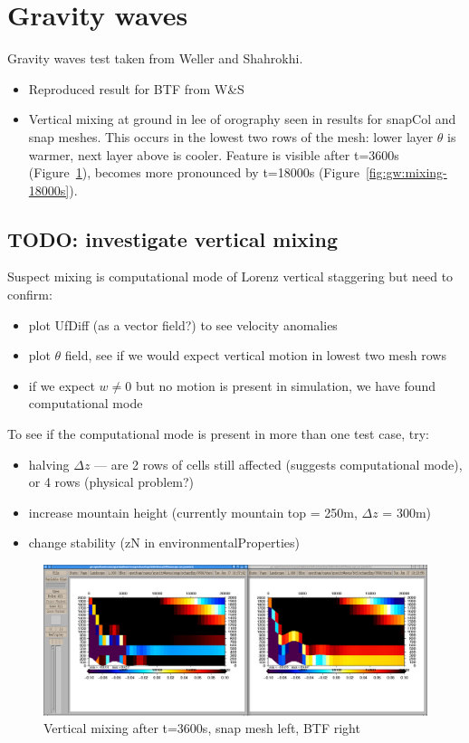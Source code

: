 \section{Gravity waves}

Gravity waves test taken from Weller and Shahrokhi.

\begin{itemize}
\item Reproduced result for BTF from W\&S
\item Vertical mixing at ground in lee of orography seen in results for snapCol and snap meshes.  This occurs in the lowest two rows of the mesh: lower layer $\theta$ is warmer, next layer above is cooler.  Feature is visible after t=3600s (Figure~\ref{fig:gw:mixing-3600s}), becomes more pronounced by t=18000s (Figure~\ref{fig:gw:mixing-18000s}).
\end{itemize}

\subsection{TODO: investigate vertical mixing}
Suspect mixing is computational mode of Lorenz vertical staggering but need to confirm:
\begin{itemize}
\item plot UfDiff (as a vector field?) to see velocity anomalies
\item plot $\theta$ field, see if we would expect vertical motion in lowest two mesh rows
\item if we expect $w \neq 0$ but no motion is present in simulation, we have found computational mode
\end{itemize}

To see if the computational mode is present in more than one test case, try:
\begin{itemize}
\item halving $\Delta z$ --- are 2 rows of cells still affected (suggests computational mode), or 4 rows (physical problem?)
\item increase mountain height (currently mountain top = 250m, $\Delta z$ = 300m)
\item change stability (zN in environmentalProperties)
\end{itemize}

\begin{figure}
\includegraphics[width=\textwidth]{interim-results/gravityWavesBTFsnapMidZoom3600.png}
\caption{Vertical mixing after t=3600s, snap mesh left, BTF right}
\label{fig:gw:mixing-3600s}
\end{figure}

